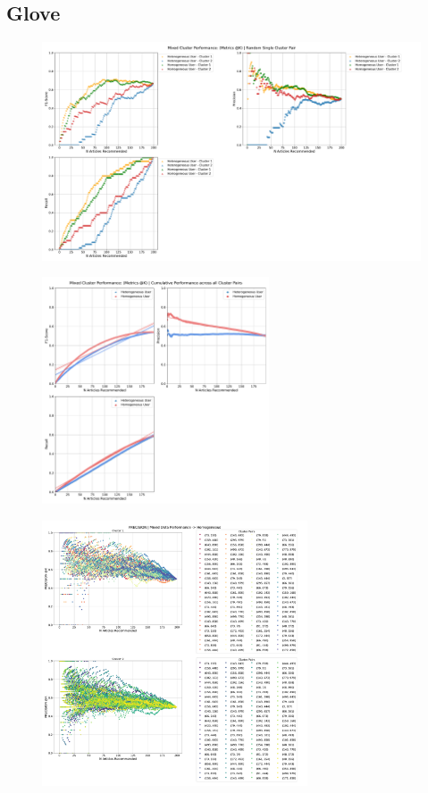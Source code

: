 \documentclass[a4paper,fontsize=8.0pt]{scrartcl}
\begin{document}
\subsection{Glove}
\begin{figure}[H]
    \includegraphics[width=1.0\textwidth]{Graphs/GLOVE/user_interaction_vs_model_performance_mixed_cluster.pdf}
\end{figure}
\begin{figure}[H]
 \includegraphics[width=0.6\textwidth]{Graphs/GLOVE/user_interaction_vs_model_performance_cumu_mixed_cluster.pdf}
\end{figure}
\begin{figure}[H]
 \includegraphics[width=0.7\textwidth]{Graphs/GLOVE/user_interaction_vs_model_performance_precision_all_cps_mixed_data_sep_Homogeneous.pdf}
\end{figure}
\end{document}
